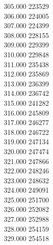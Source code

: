 { 305.000	223529 \\
 306.000	224005 \\
 307.000	224399 \\
 308.000	228155 \\
 309.000	229399 \\
 310.000	229848 \\
 311.000	235438 \\
 312.000	235869 \\
 313.000	236399 \\
 314.000	236742 \\
 315.000	241282 \\
 316.000	245809 \\
 317.000	246277 \\
 318.000	246722 \\
 319.000	247134 \\
 320.000	247474 \\
 321.000	247866 \\
 322.000	248246 \\
 323.000	248632 \\
 324.000	249091 \\
 325.000	251700 \\
 326.000	252082 \\
 327.000	252988 \\
 328.000	254159 \\
 329.000	254518 \\
}
